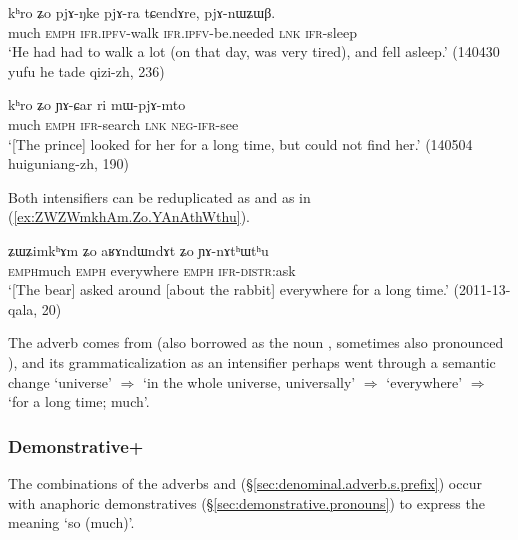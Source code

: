 \begin{exe}
\ex \label{ex:khro.Zo.pjANke}
\gll kʰro ʑo pjɤ-ŋke pjɤ-ra tɕendɤre, pjɤ-nɯʑɯβ. \\
much \textsc{emph} \textsc{ifr}.\textsc{ipfv}-walk \textsc{ifr}.\textsc{ipfv}-be.needed \textsc{lnk} \textsc{ifr}-sleep \\
\glt `He had had to walk a lot (on that day, was very tired), and fell asleep.' (140430 yufu he tade qizi-zh, 236)
\end{exe}

\begin{exe}
\ex \label{ex:khro.Zo.YACar}
\gll kʰro ʑo ɲɤ-ɕar ri mɯ-pjɤ-mto \\
much \textsc{emph} \textsc{ifr}-search \textsc{lnk} \textsc{neg}-\textsc{ifr}-see \\
\glt `[The prince] looked for her for a long time, but could not find her.' (140504 huiguniang-zh, 190)
\end{exe}

Both intensifiers can be reduplicated as  and  as in (\ref{ex:ZWZWmkhAm.Zo.YAnAthWthu}).

\begin{exe} 
\ex \label{ex:ZWZWmkhAm.Zo.YAnAthWthu}
\gll ʑɯ\redp{}ʑimkʰɤm ʑo aʁɤndɯndɤt ʑo ɲɤ-nɤtʰɯtʰu \\
\textsc{emph}\redp{}much \textsc{emph} everywhere \textsc{emph} \textsc{ifr}-\textsc{distr}:ask \\
\glt `[The bear] asked around [about the rabbit] everywhere for a long time.' (2011-13-qala, 20)
\end{exe}

The adverb  comes from  (also borrowed as the noun , sometimes also pronounced ), and its grammaticalization as an intensifier perhaps went through a semantic change `universe' $\Rightarrow$ `in the whole universe, universally' $\Rightarrow$ `everywhere' $\Rightarrow$ `for a long time; much'.

\subsubsection{Demonstrative+} \label{sec:nWtshWci}
The combinations of the adverbs  and  (§\ref{sec:denominal.adverb.s.prefix}) occur with anaphoric demonstratives (§\ref{sec:demonstrative.pronouns}) to express the meaning `so (much)'.

